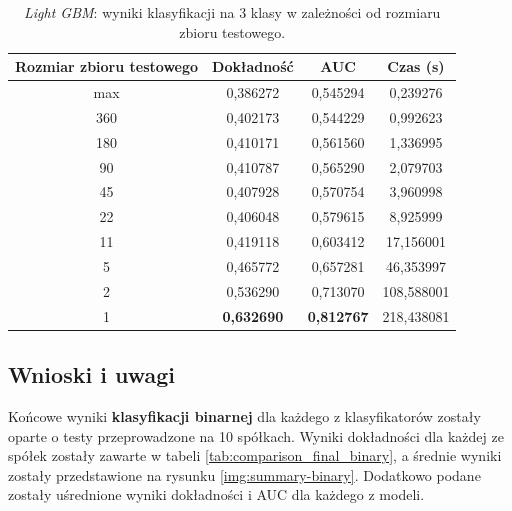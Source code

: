 \documentclass[a4paper, twoside, 11pt, openright]{article}
\begin{document}
\begin{table}[H]
    \centering
    \begin{tabular}{|c|c|c|c|}
    \hline
        \textbf{Rozmiar zbioru testowego} & \textbf{Dokładność} & \textbf{AUC} & \textbf{Czas (s)} \\ \hline
max   						 &  0,386272 &  0,545294 &    0,239276 \\ \hline
360                         &  0,402173 &  0,544229 &    0,992623 \\ \hline
180                         &  0,410171 &  0,561560 &    1,336995 \\ \hline
90                         &  0,410787 &  0,565290 &    2,079703 \\ \hline
45                          &  0,407928 &  0,570754 &    3,960998 \\ \hline
22                          &  0,406048 &  0,579615 &    8,925999 \\ \hline
11                          &  0,419118 &  0,603412 &   17,156001 \\ \hline
5                           &  0,465772 &  0,657281 &   46,353997 \\ \hline
2                           &  0,536290 &  0,713070 &  108,588001 \\ \hline
1                           &  \textbf{0,632690} &  \textbf{0,812767} &  218,438081 \\ \hline
    \end{tabular}
    \caption{\textit{Light GBM}: wyniki klasyfikacji na 3 klasy w zależności od rozmiaru zbioru testowego.}
    \label{tab:lgbm_walk_forward_discrete}
\end{table}

\subsection{Wnioski i uwagi}

Końcowe wyniki \textbf{klasyfikacji binarnej} dla każdego z klasyfikatorów zostały oparte o testy przeprowadzone na 10 spółkach. Wyniki dokładności dla każdej ze spółek zostały zawarte w tabeli \ref{tab:comparison_final_binary}, a średnie wyniki zostały przedstawione na rysunku \ref{img:summary-binary}. Dodatkowo podane zostały uśrednione wyniki dokładności i AUC dla każdego z modeli. 
\end{document}
